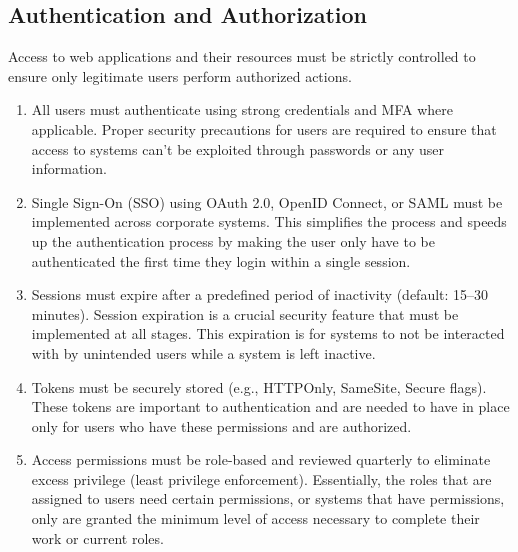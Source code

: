 \subsection{Authentication and Authorization}
Access to web applications and their resources must be strictly controlled to ensure only legitimate users perform authorized actions.
\begin{enumerate}
    \item All users must authenticate using strong credentials and MFA where applicable. Proper security precautions for users are required to ensure that access to systems can’t be exploited through passwords or any user information.
    \item Single Sign-On (SSO) using OAuth 2.0, OpenID Connect, or SAML must be implemented across corporate systems. This simplifies the process and speeds up the authentication process by making the user only have to be authenticated the first time they login within a single session.
    \item Sessions must expire after a predefined period of inactivity (default: 15–30 minutes). Session expiration is a crucial security feature that must be implemented at all stages. This expiration is for systems to not be interacted with by unintended users while a system is left inactive.
    \item Tokens must be securely stored (e.g., HTTPOnly, SameSite, Secure flags). These tokens are important to authentication and are needed to have in place only for users who have these permissions and are authorized.
    \item Access permissions must be role-based and reviewed quarterly to eliminate excess privilege (least privilege enforcement). Essentially, the roles that are assigned to users need certain permissions, or systems that have permissions, only are granted the minimum level of access necessary to complete their work or current roles.
\end{enumerate}
